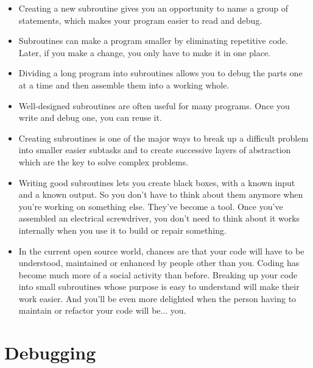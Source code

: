 \begin{itemize}

\item Creating a new subroutine gives you an opportunity to 
name a group of statements, which makes your program easier 
to read and debug.

\item Subroutines can make a program smaller by eliminating 
repetitive code.  Later, if you make a change, you only have
to make it in one place.

\item Dividing a long program into subroutines allows you 
to debug the parts one at a time and then assemble them 
into a working whole.

\item Well-designed subroutines are often useful for many programs.
Once you write and debug one, you can reuse it.

\item Creating subroutines is one of the major ways to 
break up a difficult problem into smaller easier subtasks 
and to create successive layers of abstraction which are 
the key to solve complex problems.

\item Writing good subroutines lets you create black boxes, with 
a known input and a known output. So you don't have to think 
about them anymore when you're working on something else.  
They've become a tool.  Once you've assembled an electrical 
screwdriver, you don't need to think about it works internally 
when you use it to build or repair something.

\item In the current open source world, chances are that your 
code will have to be understood, maintained or enhanced by 
people other than you. Coding has become much more of a social 
activity than before. Breaking up your code into small subroutines 
whose purpose is easy to understand will make their work easier. 
And you'll be even more delighted when the person 
having to maintain or refactor your code will be... you.

\end{itemize}


\section{Debugging}

